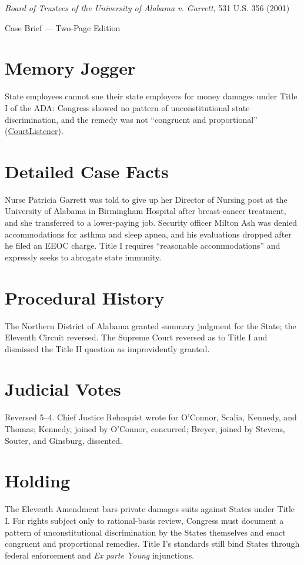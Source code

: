 \documentclass[12pt]{article}
\begin{document}
\begin{center}
{\LARGE \textit{Board of Trustees of the University of Alabama v. Garrett}, 531 U.S. 356 (2001)\par}
\vspace{0.5em}
{\large Case Brief --- Two-Page Edition\par}
\end{center}

\section{Memory Jogger}
State employees cannot sue their state employers for money damages under Title I of the ADA: Congress showed no pattern of unconstitutional state discrimination, and the remedy was not ``congruent and proportional'' (\href{https://www.courtlistener.com/opinion/118407/board-of-trustees-of-univ-of-ala-v-garrett/}{CourtListener}).

\section{Detailed Case Facts}
Nurse Patricia Garrett was told to give up her Director of Nursing post at the University of Alabama in Birmingham Hospital after breast-cancer treatment, and she transferred to a lower-paying job. Security officer Milton Ash was denied accommodations for asthma and sleep apnea, and his evaluations dropped after he filed an EEOC charge. Title I requires ``reasonable accommodations'' and expressly seeks to abrogate state immunity.

\section{Procedural History}
The Northern District of Alabama granted summary judgment for the State; the Eleventh Circuit reversed. The Supreme Court reversed as to Title I and dismissed the Title II question as improvidently granted.

\section{Judicial Votes}
Reversed 5--4. Chief Justice Rehnquist wrote for O'Connor, Scalia, Kennedy, and Thomas; Kennedy, joined by O'Connor, concurred; Breyer, joined by Stevens, Souter, and Ginsburg, dissented.

\section{Holding}
The Eleventh Amendment bars private damages suits against States under Title I. For rights subject only to rational-basis review, Congress must document a pattern of unconstitutional discrimination by the States themselves and enact congruent and proportional remedies. Title I's standards still bind States through federal enforcement and \textit{Ex parte Young} injunctions.
\end{document}

